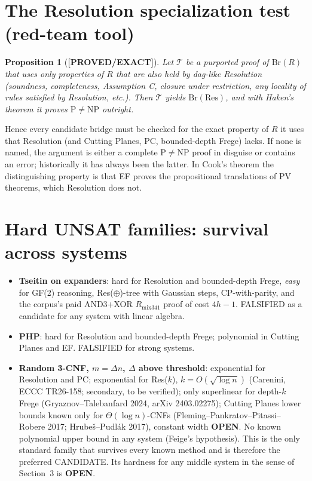 \documentclass[11pt]{article}
\newtheorem{proposition}[theorem]{Proposition}
\theoremstyle{definition}
\theoremstyle{remark}
\newcommand{\Br}{\mathrm{Br}}
\newcommand{\status}[1]{\textbf{[#1]}}
\begin{document}
\section{The Resolution specialization test (red-team tool)}
\begin{proposition}[\status{PROVED/EXACT}]
Let $\mathcal T$ be a purported proof of $\Br(R)$ that uses only properties of $R$ that are also held by
dag-like Resolution (soundness, completeness, Assumption C, closure under restriction, any locality of
rules satisfied by Resolution, etc.). Then $\mathcal T$ yields $\Br(\mathrm{Res})$, and with Haken's
theorem it proves $\mathrm P\ne\mathrm{NP}$ outright.
\end{proposition}
Hence every candidate bridge must be checked for the exact property of $R$ it uses that
Resolution (and Cutting Planes, PC, bounded-depth Frege) lacks. If none is named, the argument is either
a complete P$\ne$NP proof in disguise or contains an error; historically it has always been the latter.
In Cook's theorem the distinguishing property is that EF proves the propositional translations of PV
theorems, which Resolution does not.

\section{Hard UNSAT families: survival across systems}
\begin{itemize}
\item \textbf{Tseitin on expanders}: hard for Resolution and bounded-depth Frege, \emph{easy} for
GF(2) reasoning, Res($\oplus$)-tree with Gaussian steps, CP-with-parity, and the corpus's paid
AND3+XOR $R_{\mathrm{mix341}}$ proof of cost $4h-1$. FALSIFIED as a candidate for any system with linear algebra.
\item \textbf{PHP}: hard for Resolution and bounded-depth Frege; polynomial in Cutting Planes and EF. FALSIFIED for strong systems.
\item \textbf{Random 3-CNF, $m=\Delta n$, $\Delta$ above threshold}: exponential for Resolution and PC;
exponential for Res($k$), $k=O(\sqrt{\log n})$ (Carenini, ECCC TR26-158; secondary, to be verified);
only superlinear for depth-$k$ Frege (Gryaznov--Talebanfard 2024, arXiv 2403.02275);
Cutting Planes lower bounds known only for $\Theta(\log n)$-CNFs (Fleming--Pankratov--Pitassi--Robere 2017;
Hrubeš--Pudl\'ak 2017), constant width \textbf{OPEN}. No known polynomial upper bound in any system
(Feige's hypothesis). This is the only standard family that survives every known method and is therefore
the preferred CANDIDATE. Its hardness for any middle system in the sense of Section~3 is \textbf{OPEN}.
\end{itemize}
\end{document}
